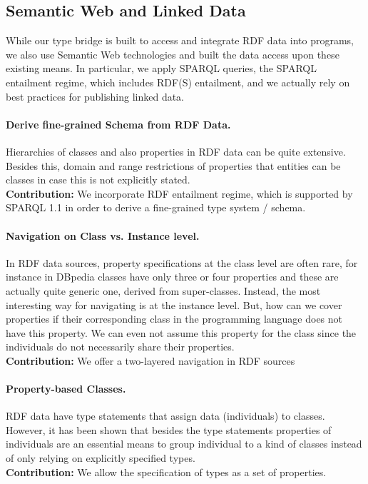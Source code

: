 \documentclass{llncs} %
\begin{document}
\subsection*{Semantic Web and Linked Data}

While our type bridge is built to access and integrate RDF data into programs,
we also use Semantic Web technologies and built the data access upon
these existing means. In particular, we apply SPARQL queries, the SPARQL entailment regime, which
includes RDF(S) entailment, and we actually rely on best practices for publishing linked data.

\paragraph*{\bf Derive fine-grained Schema from RDF Data.}
Hierarchies of classes and also properties in RDF data can be quite extensive.
Besides this, domain and range restrictions of properties that entities can be classes
in case this is not explicitly stated. \\
\textbf{Contribution:} We incorporate RDF entailment regime, which is supported by SPARQL 1.1
in order to derive a fine-grained type system / schema.


\paragraph*{\bf Navigation on Class vs. Instance level.}
In RDF data sources, property specifications at the class level are often rare,
for instance in DBpedia classes have only three or four properties and these are actually
quite generic one, derived from super-classes. Instead, the most interesting way for navigating
is at the instance level. But, how can we cover properties if their corresponding class
in the programming language does not have this property. We can even not assume this property
for the class since the individuals do not necessarily share their properties. \\
\textbf{Contribution:}  We offer a two-layered navigation in RDF sources

\paragraph*{\bf Property-based Classes.}
RDF data have type statements that assign data (individuals) to classes.
However, it has been shown that besides the type statements
properties of individuals are an essential means to group individual to a kind of
classes instead of only relying on explicitly specified types. \\
\textbf{Contribution:} We allow the specification of types as a set of properties. \\
\end{document}

